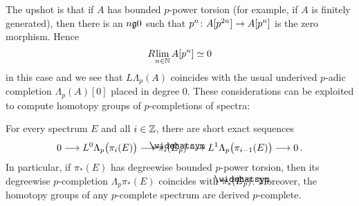 The upshot is that if $A$ has bounded $p$-power torsion (for example, if $A$ is finitely generated), then there is an $n\gge 0$ such that $p^n\colon A[p^{2n}]\morphism A[p^n]$ is the zero morphism. Hence
\begin{equation*}
	R\!\operatorname*{lim}_{n\in\mathbb{N}}A[p^n]\simeq 0
\end{equation*}
in this case and we see that $L\Lambda_p(A)$ coincides with the usual underived $p$-adic completion $\Lambda_p(A)[0]$ placed in degree $0$. These considerations can be exploited to compute homotopy groups of $p$-completions of spectra:
\begin{smalllem}\label{lem:HomotopyOfPCompletion}
	For every spectrum $E$ and all $i\in \mathbb{Z}$, there are short exact sequences
	\begin{equation*}
		0\morphism L^0\Lambda_p\big(\pi_i(E)\big)\morphism \pi_i(\roof{E}_p)\morphism L^1\Lambda_p\big(\pi_{i-1}(E)\big)\morphism 0\,.
	\end{equation*}
	In particular, if $\pi_*(E)$ has degreewise bounded $p$-power torsion, then its degreewise $p$-completion $\Lambda_p\pi_*(E)$ coincides with $\pi_*(\roof{E}_p)$. Moreover, the homotopy groups of any $p$-complete spectrum are derived $p$-complete.
\end{smalllem}
